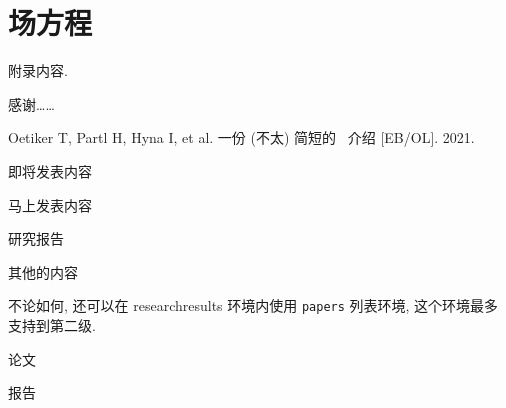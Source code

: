 \documentclass[draft,newenv,newcmd]{ncuthesis}
\begin{document}
\section{场方程}
附录内容.
\backmatter

\begin{acknowledgements}
感谢……
\end{acknowledgements}
\begin{researchresults}
\begin{published}
\item Oetiker T, Partl H, Hyna I, et al. 一份 (不太) 简短的
\LaTeXe\ 介绍 [EB/OL]. 2021.
\end{published}
\begin{tobepublished}
\item 即将发表内容
\item 马上发表内容
\end{tobepublished}
\begin{reports}
\item 研究报告
\end{reports}
\begin{others}[另外还有]
\item 其他的内容
\end{others}
不论如何, 还可以在 \textsf{researchresults} 环境内使用
\texttt{papers} 列表环境, 这个环境最多支持到第二级. 
\begin{papers}
\item 论文
\item 报告
\end{papers}
\end{researchresults}
\end{document}
